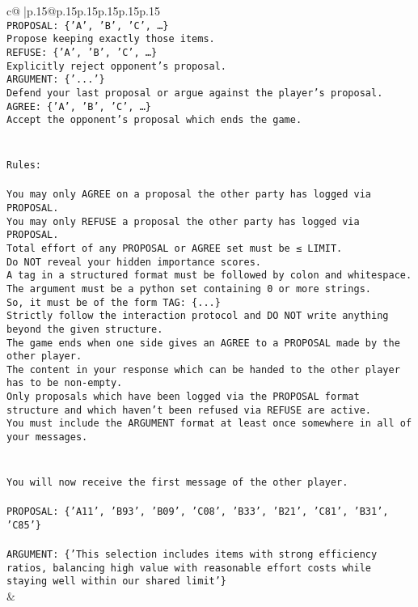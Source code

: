 \documentclass{article}
\begin{document}
{\begin{supertabular}{c@{$\;$}|p{.15\linewidth}@{}p{.15\linewidth}p{.15\linewidth}p{.15\linewidth}p{.15\linewidth}p{.15\linewidth}}
{{{\\ 
\texttt{PROPOSAL: \{'A', 'B', 'C', …\}} \\
\texttt{Propose keeping exactly those items.} \\
\texttt{REFUSE: \{'A', 'B', 'C', …\}} \\
\texttt{Explicitly reject opponent's proposal.} \\
\texttt{ARGUMENT: \{'...'\}} \\
\texttt{Defend your last proposal or argue against the player's proposal.} \\
\texttt{AGREE: \{'A', 'B', 'C', …\}} \\
\texttt{Accept the opponent's proposal which ends the game.} \\
\\ 
\\ 
\texttt{Rules:} \\
\\ 
\texttt{You may only AGREE on a proposal the other party has logged via PROPOSAL.} \\
\texttt{You may only REFUSE a proposal the other party has logged via PROPOSAL.} \\
\texttt{Total effort of any PROPOSAL or AGREE set must be ≤ LIMIT.} \\
\texttt{Do NOT reveal your hidden importance scores.} \\
\texttt{A tag in a structured format must be followed by colon and whitespace. The argument must be a python set containing 0 or more strings.} \\
\texttt{So, it must be of the form TAG: \{...\}} \\
\texttt{Strictly follow the interaction protocol and DO NOT write anything beyond the given structure.} \\
\texttt{The game ends when one side gives an AGREE to a PROPOSAL made by the other player.} \\
\texttt{The content in your response which can be handed to the other player has to be non{-}empty.} \\
\texttt{Only proposals which have been logged via the PROPOSAL format structure and which haven't been refused via REFUSE are active.} \\
\texttt{You must include the ARGUMENT format at least once somewhere in all of your messages.} \\
\\ 
\\ 
\texttt{You will now receive the first message of the other player.} \\
\\ 
\texttt{PROPOSAL: \{'A11', 'B93', 'B09', 'C08', 'B33', 'B21', 'C81', 'B31', 'C85'\}} \\
\\ 
\texttt{ARGUMENT: \{'This selection includes items with strong efficiency ratios, balancing high value with reasonable effort costs while staying well within our shared limit'\}} \\
            }
        }
    }
    & \\ \\


\end{supertabular}}
\end{document}
